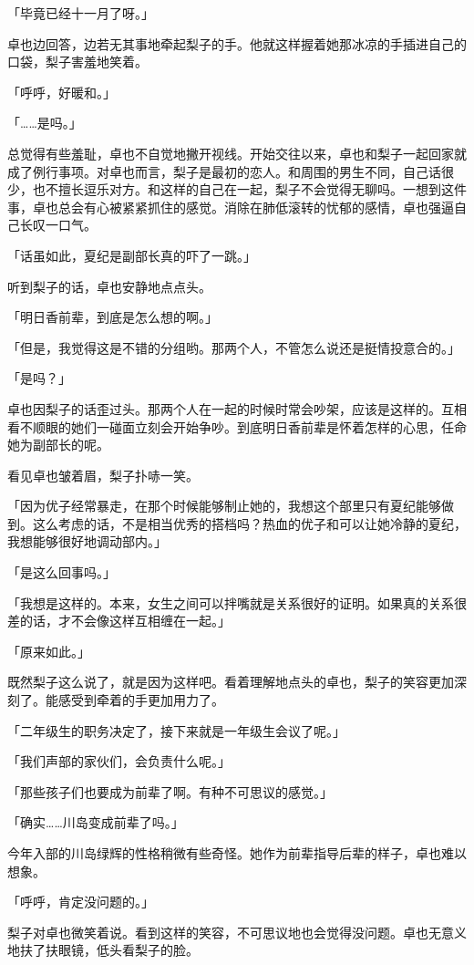 \documentclass[UTF8]{ctexart}
\begin{document}
    「毕竟已经十一月了呀。」

    卓也边回答，边若无其事地牵起梨子的手。他就这样握着她那冰凉的手插进自己的口袋，梨子害羞地笑着。

    「呼呼，好暖和。」

    「……是吗。」

    总觉得有些羞耻，卓也不自觉地撇开视线。开始交往以来，卓也和梨子一起回家就成了例行事项。对卓也而言，梨子是最初的恋人。和周围的男生不同，自己话很少，也不擅长逗乐对方。和这样的自己在一起，梨子不会觉得无聊吗。一想到这件事，卓也总会有心被紧紧抓住的感觉。消除在肺低滚转的忧郁的感情，卓也强逼自己长叹一口气。

    「话虽如此，夏纪是副部长真的吓了一跳。」

    听到梨子的话，卓也安静地点点头。

    「明日香前辈，到底是怎么想的啊。」

    「但是，我觉得这是不错的分组哟。那两个人，不管怎么说还是挺情投意合的。」

    「是吗？」

    卓也因梨子的话歪过头。那两个人在一起的时候时常会吵架，应该是这样的。互相看不顺眼的她们一碰面立刻会开始争吵。到底明日香前辈是怀着怎样的心思，任命她为副部长的呢。

    看见卓也皱着眉，梨子扑哧一笑。

    「因为优子经常暴走，在那个时候能够制止她的，我想这个部里只有夏纪能够做到。这么考虑的话，不是相当优秀的搭档吗？热血的优子和可以让她冷静的夏纪，我想能够很好地调动部内。」

    「是这么回事吗。」

    「我想是这样的。本来，女生之间可以拌嘴就是关系很好的证明。如果真的关系很差的话，才不会像这样互相缠在一起。」

    「原来如此。」

    既然梨子这么说了，就是因为这样吧。看着理解地点头的卓也，梨子的笑容更加深刻了。能感受到牵着的手更加用力了。

    「二年级生的职务决定了，接下来就是一年级生会议了呢。」

    「我们声部的家伙们，会负责什么呢。」

    「那些孩子们也要成为前辈了啊。有种不可思议的感觉。」

    「确实……川岛变成前辈了吗。」

    今年入部的川岛绿辉的性格稍微有些奇怪。她作为前辈指导后辈的样子，卓也难以想象。

    「呼呼，肯定没问题的。」

    梨子对卓也微笑着说。看到这样的笑容，不可思议地也会觉得没问题。卓也无意义地扶了扶眼镜，低头看梨子的脸。
\end{document}
